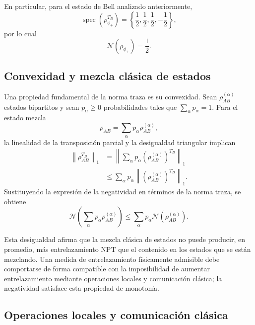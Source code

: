 \documentclass[12pt,a4paper]{article}
\theoremstyle{definition}
\theoremstyle{plain}
\theoremstyle{remark}
\begin{document}
En particular, para el estado de Bell analizado anteriormente,
\begin{equation*}
    \operatorname{spec}\left(\rho_{\phi_+}^{T_B}\right)
    =\left\{\frac{1}{2},\frac{1}{2},\frac{1}{2},-\frac{1}{2}\right\},
\end{equation*}
por lo cual
\begin{equation*}
    \mathcal{N}(\rho_{\phi_+})=\frac{1}{2}.
\end{equation*}

\subsection{Convexidad y mezcla clásica de estados}

Una propiedad fundamental de la norma traza es su convexidad. Sean $\rho_{AB}^{(\alpha)}$ estados bipartitos y sean $p_\alpha\geq 0$ probabilidades tales que $\sum_\alpha p_\alpha=1$. Para el estado mezcla
\begin{equation*}
    \rho_{AB}=\sum_\alpha p_\alpha\rho_{AB}^{(\alpha)},
\end{equation*}
la linealidad de la transposición parcial y la desigualdad triangular implican
\begin{align*}
    \left\|\rho_{AB}^{T_B}\right\|_1
    &=\left\|
        \sum_\alpha p_\alpha
        \left(\rho_{AB}^{(\alpha)}\right)^{T_B}
      \right\|_1 \\
    &\leq
      \sum_\alpha p_\alpha
      \left\|\left(\rho_{AB}^{(\alpha)}\right)^{T_B}\right\|_1.
\end{align*}
Sustituyendo la expresión de la negatividad en términos de la norma traza, se obtiene
\begin{equation*}
    \mathcal{N}\!\left(\sum_\alpha p_\alpha\rho_{AB}^{(\alpha)}\right)
    \leq
    \sum_\alpha p_\alpha\mathcal{N}\!\left(\rho_{AB}^{(\alpha)}\right).
\end{equation*}

Esta desigualdad afirma que la mezcla clásica de estados no puede producir, en promedio, más entrelazamiento NPT que el contenido en los estados que se están mezclando. Una medida de entrelazamiento físicamente admisible debe comportarse de forma compatible con la imposibilidad de aumentar entrelazamiento mediante operaciones locales y comunicación clásica; la negatividad satisface esta propiedad de monotonía.

\subsection{Operaciones locales y comunicación clásica}\label{subsec:locc}
\end{document}

